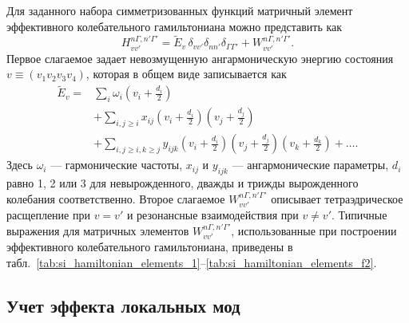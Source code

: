 Для заданного набора симметризованных функций матричный элемент эффективного колебательного
гамильтониана можно представить как
\begin{equation}
H_{vv'}^{n\Gamma,n'\Gamma'} = \widetilde{E}_{v}\,\delta_{vv'}\delta_{nn'}\delta_{\Gamma\Gamma'}
+ W_{vv'}^{n\Gamma,n'\Gamma'} .
\label{eq:si_hamiltonian_matrix}
\end{equation}
Первое слагаемое задает невозмущенную ангармоническую энергию состояния $v\equiv(v_1v_2v_3v_4)$,
которая в общем виде записывается как
\begin{equation}
\begin{aligned}
\widetilde{E}_{v} ={}&
\sum_i \omega_i\left(v_i+\frac{d_i}{2}\right) \\
&+\sum_{i,j\geq i} x_{ij}
\left(v_i+\frac{d_i}{2}\right)
\left(v_j+\frac{d_j}{2}\right) \\
&+\sum_{i,j\geq i,k\geq j} y_{ijk}
\left(v_i+\frac{d_i}{2}\right)
\left(v_j+\frac{d_j}{2}\right)
\left(v_k+\frac{d_k}{2}\right)
+\ldots .
\end{aligned}
\label{eq:si_unperturbed_energy}
\end{equation}
Здесь $\omega_i$ --- гармонические частоты, $x_{ij}$ и $y_{ijk}$ --- ангармонические параметры,
$d_i$ равно 1, 2 или 3 для невырожденного, дважды и трижды вырожденного колебания соответственно.
Второе слагаемое $W_{vv'}^{n\Gamma,n'\Gamma'}$ описывает тетраэдрическое расщепление при $v=v'$ и
резонансные взаимодействия при $v\neq v'$. Типичные выражения для матричных элементов $W_{vv'}^{n\Gamma,n'\Gamma'}$,
использованные при построении эффективного колебательного гамильтониана,
приведены в табл.~\ref{tab:si_hamiltonian_elements_1}--\ref{tab:si_hamiltonian_elements_f2}.









\subsection{Учет эффекта локальных мод}

